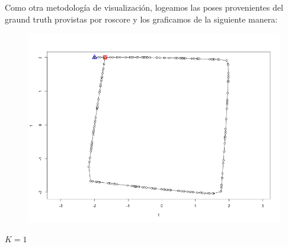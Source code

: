 Como otra metodología de visualización, logeamos las poses provenientes del graund truth provistas por roscore y los graficamos de la siguiente manera:

\begin{figure}[!htb]
\begin{center}
\includegraphics[width=\linewidth/2]{imagenesTrayectorias/lazocerrado/lazocerrado04.png}
\end{center}
\end{figure}
\FloatBarrier

$K = 1$

